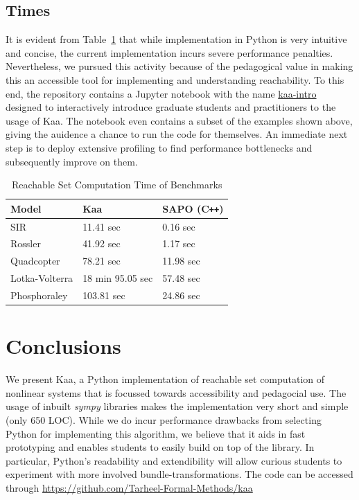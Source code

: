 \documentclass[EPiC]{easychair}
\begin{document}
\subsection{Times}

\noindent It is evident from Table~\ref{tab:one} that while implementation in Python is very intuitive and concise, the current implementation incurs severe performance penalties. 
%
Nevertheless, we pursued this activity because of the pedagogical value in making this an accessible tool for implementing and understanding reachability. To this end, the repository contains a Jupyter notebook with the name \href{https://github.com/Tarheel-Formal-Methods/kaa/blob/master/kaa-intro.ipynb}{kaa-intro} designed to interactively introduce graduate students and practitioners to the usage of Kaa. The notebook even contains a subset of the examples shown above, giving the auidence a chance to run the code for themselves. An immediate next step is to deploy extensive profiling to find performance bottlenecks and subsequently improve on them. 

\begin{table}[h]
\centering
\caption{Reachable Set Computation Time of Benchmarks}\label{tab:one}
\begin{tabular}{|l | l l|}
\hline
{\bf Model} &{\bf Kaa } & {\bf SAPO } (C\texttt{++})\\
\hline
SIR &  11.41 sec & 0.16 sec\\

Rossler &  41.92 sec & 1.17 sec\\

Quadcopter & 78.21 sec & 11.98 sec \\

Lotka-Volterra & 18 min 95.05 sec  & 57.48 sec\\
 
 Phosphoraley & 103.81 sec & 24.86 sec \\
\hline
\end{tabular}
\end{table}

\section{Conclusions}

We present Kaa, a Python implementation of reachable set computation of nonlinear systems that is focussed towards accessibility and pedagocial use.
%
The usage of inbuilt \emph{sympy} libraries makes the implementation very short and simple (only 650 LOC).
%
While we do incur performance drawbacks from selecting Python for implementing this algorithm, we believe that it aids in fast prototyping and enables students to easily build on top of the library. In particular, Python's readability and extendibility will allow curious students to experiment with more involved bundle-transformations. 
%
The code can be accessed through \url{https://github.com/Tarheel-Formal-Methods/kaa}
\end{document}
